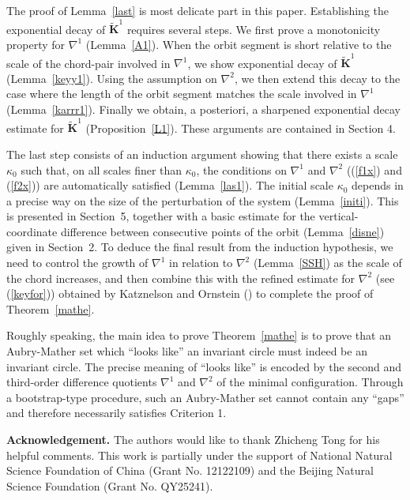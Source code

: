 \documentclass{amsart}
\theoremstyle{definition}
\begin{document}
The proof of Lemma~\ref{last} is most delicate part in this paper. Establishing the exponential decay of \(\widetilde{\mathbf{K}}^1\) requires several steps. We first prove a monotonicity property for \(\nabla^1\) (Lemma~\ref{A1}). When the orbit segment is short relative to the scale of the chord-pair involved in \(\nabla^1\), we show exponential decay of \(\widetilde{\mathbf{K}}^1\) (Lemma~\ref{keyy1}). Using the assumption on \(\nabla^2\), we then extend this decay to the case where the length of the orbit segment matches the scale involved in  \(\nabla^1\) (Lemma~\ref{karrr1}). Finally we obtain, a posteriori, a sharpened exponential decay estimate for \(\widetilde{\mathbf{K}}^1\) (Proposition~\ref{L1}). These arguments are contained in Section 4.

The last step consists of an induction argument showing that there exists a scale \(\kappa_0\) such that, on all scales finer than \(\kappa_0\), the conditions on \(\nabla^1\) and \(\nabla^2\) ((\ref{f1x}) and (\ref{f2x})) are automatically satisfied (Lemma~\ref{las1}). The initial scale \(\kappa_0\) depends in a precise way on the size of the perturbation of the system (Lemma~\ref{initi}). This is presented in Section~5, together with a basic estimate for the vertical-coordinate difference between consecutive points of the orbit (Lemma~\ref{disne}) given in Section~2. To deduce the final result from the induction hypothesis, we need to control the growth of \(\nabla^1\) in relation to \(\nabla^2\) (Lemma~\ref{SSH}) as the scale of the chord increases, and then combine this with the refined estimate for \(\nabla^2\) (see (\ref{keyfor})) obtained by Katznelson and Ornstein (\cite[Corollary 3.1]{KO1}) to complete the proof of Theorem~\ref{mathe}.

Roughly speaking, the main idea to prove Theorem~\ref{mathe}  is to prove that an Aubry-Mather set which ``looks like'' an invariant circle must indeed be an invariant circle. The precise meaning of ``looks like'' is encoded by the second and third-order difference quotients \(\nabla^1\) and \(\nabla^2\) of the minimal configuration. Through a bootstrap-type procedure, such an Aubry-Mather set cannot contain any ``gaps'' and therefore necessarily satisfies Criterion 1.






\vspace{2em}

\noindent\textbf{Acknowledgement.}   The authors would like to thank Zhicheng Tong for his helpful comments.  This work is partially under the support of National Natural Science Foundation of China (Grant No. 12122109) and the Beijing Natural Science Foundation (Grant No. QY25241).
\end{document}
